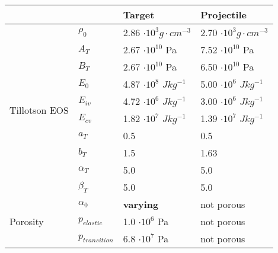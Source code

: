 \begin{table}
    \centering
    \begin{tabular}{ |l|l|l|l| }
        \hline
        \multicolumn{2}{|c|}{}                & Target                  & Projectile                                                          \\
        \hline
        \multirow{10}{*}{Tillotson EOS}       & $\rho_0$                & 2.86 $\cdot 10^3 g\cdot cm^{-3}$ & 2.70 $\cdot 10^3 g\cdot cm^{-3}$ \\
                                              & $A_T$                   & 2.67 $\cdot 10^{10}$ Pa          & 7.52 $\cdot 10^{10}$ Pa          \\
                                              & $B_T$                   & 2.67 $\cdot 10^{10}$ Pa          & 6.50 $\cdot 10^{10}$ Pa          \\
                                              & $E_0$                   & 4.87 $\cdot 10^8$ $Jkg^{-1}$     & 5.00 $\cdot 10^6$ $Jkg^{-1}$     \\
                                              & $E_{iv}$                & 4.72 $\cdot 10^6$ $Jkg^{-1}$     & 3.00 $\cdot 10^6$ $Jkg^{-1}$     \\
                                              & $E_{cv}$                & 1.82 $\cdot 10^7$ $Jkg^{-1}$     & 1.39 $\cdot 10^7$ $Jkg^{-1}$     \\
                                              & $a_T$                   & 0.5                              & 0.5                              \\
                                              & $b_T$                   & 1.5                              & 1.63                             \\
                                              & $\alpha_T$              & 5.0                              & 5.0                              \\
                                              & $\beta_T$               & 5.0                              & 5.0                              \\ \hline
        \multirow{7}{*}{Porosity}             & $\alpha_0$              & \textbf{varying}                 & not porous                       \\
                                              & $p_{elastic}$           & 1.0 $\cdot 10^6$ Pa              & not porous                       \\
                                              & $p_{transition}$        & 6.8 $\cdot 10^7$ Pa              & not porous                       \\

\end{tabular}
\end{table}
